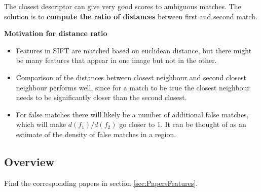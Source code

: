 \documentclass[10pt,a4paper]{scrartcl}
\begin{document}
\begin{multicols*}{2}
The closest descriptor can give very good scores to ambiguous matches. The solution is to \textbf{compute the ratio of distances} between first and second match.


\textbf{Motivation for distance ratio}

\begin{itemize}
\item Features in SIFT are matched based on euclidean distance, but there might be many features that appear in one image but not in the other.
\item Comparison of the distances between closest neighbour and second closest neighbour performs well, since for a match to be true the closest neighbour needs to be significantly closer than the second closest.
\item For false matches there will likely be a number of additional false matches, which will make $d(f_1)/d(f_2)$ go closer to $1$. It can be thought of as an estimate of the density of false matches in a region.
\end{itemize}

\def\slidesizehere{0.8}
\subsection{Overview}
Find the corresponding papers in section \ref{sec:PapersFeatures}.


\end{multicols*}
\end{document}
